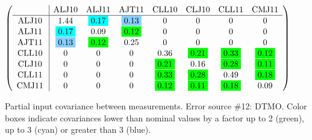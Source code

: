\begin{table}[H]
\scriptsize
\begin{center}
\renewcommand{\arraystretch}{1.1}
\begin{math}\left(\begin{array}{c|ccccccc}
 & \mathrm{ALJ10} & 
\mathrm{ALJ11} & 
\mathrm{AJT11} & 
\mathrm{CLL10} & 
\mathrm{CLJ10} & 
\mathrm{CLL11} & 
\mathrm{CMJ11} \\
\hline
\mathrm{ALJ10} \hspace*{2pt} &       1.44 &  \colorbox{Cyan1}{$      0.17$} &  \colorbox{SkyBlue1}{$      0.13$} &  0 &  0 &  0 &  0 \\
\mathrm{ALJ11} \hspace*{2pt} &  \colorbox{Cyan1}{$      0.17$} &       0.09 &  \colorbox{Green1}{$      0.12$} &  0 &  0 &  0 &  0 \\
\mathrm{AJT11} \hspace*{2pt} &  \colorbox{SkyBlue1}{$      0.13$} &  \colorbox{Green1}{$      0.12$} &       0.25 &  0 &  0 &  0 &  0 \\
\mathrm{CLL10} \hspace*{2pt} &  0 &  0 &  0 &       0.36 &  \colorbox{Green1}{$      0.21$} &  \colorbox{Green1}{$      0.33$} &  \colorbox{Green1}{$      0.12$} \\
\mathrm{CLJ10} \hspace*{2pt} &  0 &  0 &  0 &  \colorbox{Green1}{$      0.21$} &       0.16 &  \colorbox{Green1}{$      0.28$} &  \colorbox{Green1}{$      0.11$} \\
\mathrm{CLL11} \hspace*{2pt} &  0 &  0 &  0 &  \colorbox{Green1}{$      0.33$} &  \colorbox{Green1}{$      0.28$} &       0.49 &  \colorbox{Green1}{$      0.18$} \\
\mathrm{CMJ11} \hspace*{2pt} &  0 &  0 &  0 &  \colorbox{Green1}{$      0.12$} &  \colorbox{Green1}{$      0.11$} &  \colorbox{Green1}{$      0.18$} &       0.09 \\
\end{array}\right)\end{math}
\caption{Partial input covariance between measurements. Error source \#12: DTMO. Color boxes indicate covariances lower than nominal values by a factor up to 2 (green), up to 3 (cyan) or greater than 3 (blue).}
\renewcommand{\arraystretch}{1}
\end{center}
\end{table}
